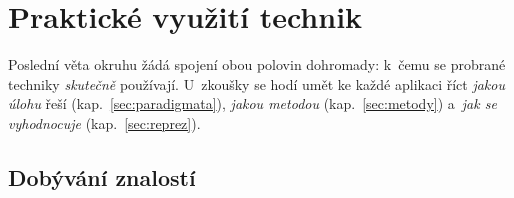 \documentclass[11pt,a4paper]{article}
\theoremstyle{definition}
\begin{document}
\newpage
\section{Praktické využití technik}
\label{sec:praxe}

Poslední věta okruhu žádá spojení obou polovin dohromady: k~čemu se probrané techniky
\emph{skutečně} používají. U~zkoušky se hodí umět ke každé aplikaci říct \emph{jakou úlohu}
řeší (kap.~\ref{sec:paradigmata}), \emph{jakou metodou} (kap.~\ref{sec:metody}) a~\emph{jak se
vyhodnocuje} (kap.~\ref{sec:reprez}).

\subsection{Dobývání znalostí}
\end{document}
